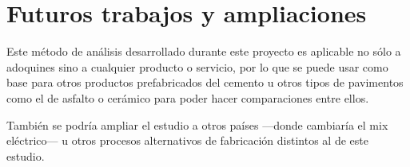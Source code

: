 \section{Futuros trabajos y ampliaciones}

Este método de análisis desarrollado durante este proyecto es aplicable no sólo a adoquines sino a cualquier producto o servicio, por lo que se puede usar como base para otros productos prefabricados del cemento u otros tipos de pavimentos como el de asfalto o cerámico para poder hacer comparaciones entre ellos.

También se podría ampliar el estudio a otros países —donde cambiaría el mix eléctrico— u otros procesos alternativos de fabricación distintos al de este estudio.
